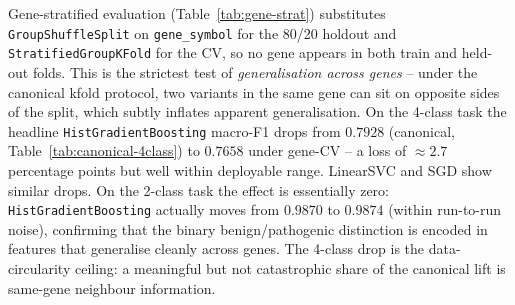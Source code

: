 \documentclass[11pt,a4paper]{article}
\begin{document}
Gene-stratified evaluation (Table~\ref{tab:gene-strat}) substitutes
\texttt{GroupShuffleSplit} on \texttt{gene\_symbol} for the 80/20 holdout and
\texttt{StratifiedGroupKFold} for the CV, so no gene appears in both train and
held-out folds. This is the strictest test of \emph{generalisation across genes}
-- under the canonical kfold protocol, two variants in the same gene can sit on
opposite sides of the split, which subtly inflates apparent generalisation. On
the 4-class task the headline \texttt{HistGradientBoosting} macro-F1 drops from
$0.7928$ (canonical, Table~\ref{tab:canonical-4class}) to $0.7658$ under gene-CV
-- a loss of $\approx 2.7$ percentage points but well within deployable range.
LinearSVC and SGD show similar drops. On the 2-class task the effect is
essentially zero: \texttt{HistGradientBoosting} actually moves from $0.9870$ to
$0.9874$ (within run-to-run noise), confirming that the binary
benign/pathogenic distinction is encoded in features that generalise cleanly
across genes. The 4-class drop is the data-circularity ceiling: a meaningful
but not catastrophic share of the canonical lift is same-gene neighbour
information.
\end{document}
